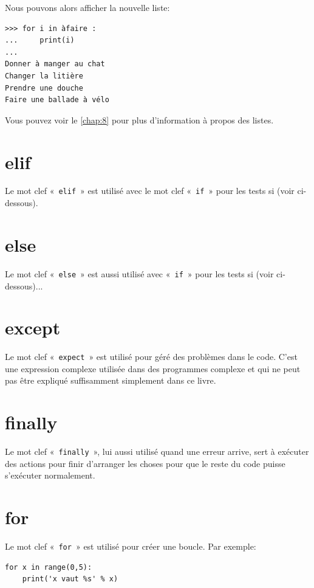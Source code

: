Nous pouvons alors afficher la nouvelle liste:
\begin{Verbatim}[frame=single,rulecolor=\color{gray}]
>>> for i in àfaire :
...     print(i)
...
Donner à manger au chat
Changer la litière
Prendre une douche
Faire une ballade à vélo
\end{Verbatim}

Vous pouvez voir le \autoref{chap:8} pour plus d'information à propos des listes.

\section*{elif}

Le mot clef « \texttt{elif} » est utilisé avec le mot clef « \texttt{if} » pour les tests si (voir ci-dessous). 

\section*{else}

Le mot clef « \texttt{else} » est aussi utilisé avec « \texttt{if} » pour les tests si (voir ci-dessous)...

\section*{except}

Le mot clef « \texttt{expect} » est utilisé pour géré des problèmes dans le code. C'est une expression complexe utilisée dans des programmes complexe et qui ne peut pas être expliqué suffisamment simplement dans ce livre. 


\section*{finally}

Le mot clef « \texttt{finally} », lui aussi utilisé quand une erreur arrive, sert à exécuter des actions pour finir d'arranger les choses pour que le reste du code puisse s'exécuter normalement.

\section*{for}

Le mot clef « \texttt{for} » est utilisé pour créer une boucle. Par exemple:
\begin{Verbatim}[frame=single,rulecolor=\color{gray}]
for x in range(0,5):
    print('x vaut %s' % x)
\end{Verbatim}


